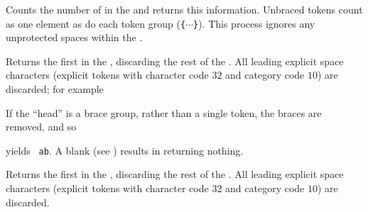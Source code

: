 \documentclass[oneside]{book}
\begin{document}
\begin{function}{\tlVarCount}
\begin{syntax}
 
\end{syntax}
Counts the number of  in the  and returns this information.
Unbraced tokens count as one element as do each token group (\verb|{|$\cdots$\verb|}|).
This process ignores any unprotected spaces within the . %
\begin{demohigh}
\tlSet {}
\tlVarCount \lTmpaTl
\end{demohigh}
\end{function}

\begin{function}{\tlHead}
\begin{syntax}
 
\end{syntax}
Returns the first  in the ,
discarding the rest of the .
All leading explicit space characters
(explicit tokens with character code $32$ and category code $10$)
are discarded; for example
\begin{demohigh}
\end{demohigh}
If the \enquote{head} is a brace group, rather than a single token,
the braces are removed, and so
\begin{codehigh}
\end{codehigh}
yields \verb*| ab|.
A blank  (see ) results in
 returning nothing.
\end{function}

\begin{function}{\tlVarHead}
\begin{syntax}
 
\end{syntax}
Returns the first  in the ,
discarding the rest of the .
All leading explicit space characters (explicit tokens with character code $32$
and category code $10$) are discarded.
\begin{demohigh}
\tlSet {}
\tlVarHead \lTmpaTl
\end{demohigh}
\end{function}
\end{document}
